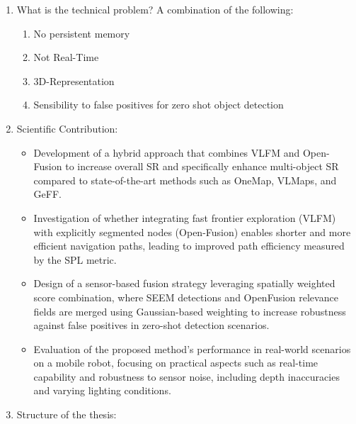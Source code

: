 \begin{enumerate}
    \item What is the technical problem? A combination of the following:
    \begin{enumerate}
        \item No persistent memory
        \item Not Real-Time
        \item 3D-Representation
        \item Sensibility to false positives for zero shot object detection
    \end{enumerate}
    \item Scientific Contribution:
    \begin{itemize}
        \item Development of a hybrid approach that combines \ac{VLFM} \cite{yokoyama2024vlfm} and Open-Fusion \cite{kashu2023openfusion} to increase overall \ac{SR} and specifically enhance multi-object \ac{SR} compared to state-of-the-art methods such as \ac{OneMap}, \ac{VLMaps}, and \ac{GeFF}.
        \item Investigation of whether integrating fast frontier exploration (\ac{VLFM}) with explicitly segmented nodes (Open-Fusion) enables shorter and more efficient navigation paths, leading to improved path efficiency measured by the \ac{SPL} metric.
        \item Design of a sensor-based fusion strategy leveraging spatially weighted score combination, where \ac{SEEM} \cite{zou2023seem} detections and OpenFusion \cite{kashu2023openfusion} relevance fields are merged using Gaussian-based weighting to increase robustness against false positives in zero-shot detection scenarios.
        \item Evaluation of the proposed method’s performance in real-world scenarios on a mobile robot, focusing on practical aspects such as real-time capability and robustness to sensor noise, including depth inaccuracies and varying lighting conditions.
    \end{itemize}
    \item Structure of the thesis:
\end{enumerate}
